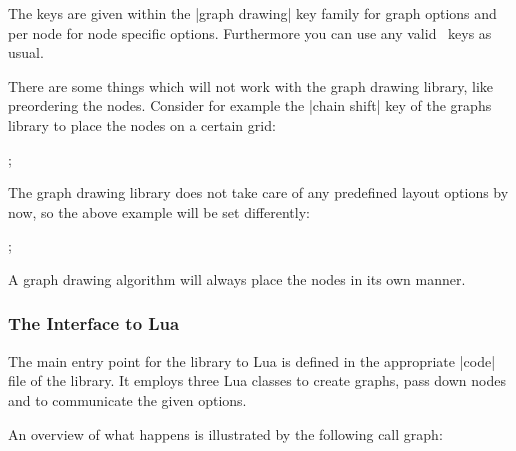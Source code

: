 The keys are given within the |graph drawing| key family for graph options and per node for node specific options. Furthermore you can use any valid \tikzname\ keys as usual. 

There are some things which will not work with the graph drawing
library, like preordering the nodes. Consider for example the
|chain shift| key of the graphs library to place the nodes on a
certain grid: 

\begin{codeexample}[]
\tikzpicture
  ;
\endtikzpicture
\end{codeexample}

The graph drawing library does not take care of any predefined layout options by now, so the above example will be set differently:

\begin{codeexample}[]
\tikzpicture[graph drawing={few intersections}, scale=2]
  ;
\endtikzpicture
\end{codeexample}

A graph drawing algorithm will always place the nodes in its own manner. 


\subsubsection{The Interface to Lua}
The main entry point for the library to Lua is defined in the
appropriate |code| file of the library. It employs three Lua classes
to create graphs, pass down nodes and to communicate the given
options.

An overview of what happens is illustrated by the following call graph:

